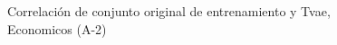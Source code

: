 \begin{figure}[H]
    \centering
    
    \caption{Correlación de conjunto original de entrenamiento y Tvae, Economicos (A-2)}
    \label{pairwise-economicos-a-2-tvae}
\end{figure}